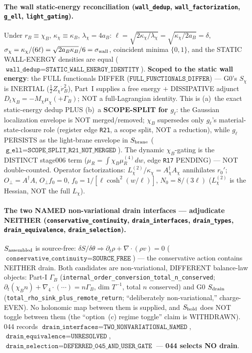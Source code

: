 \paragraph{The wall static-energy reconciliation (\texttt{wall\_dedup}, \texttt{wall\_factorization}, \texttt{g\_ell}, \texttt{light\_gating}).}
Under \(r_B\equiv\chi_B\), \(\kappa_\chi\equiv\kappa_B\), \(\lambda_\chi=4a_B\):
\(\ell=\sqrt{2\kappa_\chi/\lambda_\chi}=\sqrt{\kappa_\chi/2a_B}=\delta\),
\(\sigma_\chi=\kappa_\chi/(6\ell)=\sqrt{2a_B\kappa_B}/6=\sigma_{\rm wall}\), coincident
minima \(\{0,1\}\), and the STATIC WALL-ENERGY densities are equal
(\(\texttt{wall\_dedup}=\texttt{STATIC\_WALL\_ENERGY\_IDENTITY}\)). \textbf{Scoped to
the static wall energy}: the FULL functionals DIFFER
(\(\texttt{FULL\_FUNCTIONALS\_DIFFER}\)) --- G0's \(S_\chi\) is INERTIAL
(\(\tfrac12 Z_\chi\dot r_B^2\)), Part~I supplies a free energy \(+\) DISSIPATIVE
adjunct \(D_t\chi_B=-M_\chi\mu_\chi(+\Gamma_B)\); NOT a full-Lagrangian identity. This
is (a)~the exact static-energy dedup PLUS (b)~a \textbf{SCOPE-SPLIT for \(g_\ell\)}: the
Gaussian localization envelope is NOT merged/removed; \(\chi_B\) supersedes only
\(g_\ell\)'s material-state-closure role (register edge \texttt{R21}, a scope split, NOT
a reduction), while \(g_\ell\) PERSISTS as the light-brane envelope in \(S_{\rm brane}\)
(\(\texttt{g\_ell}=\texttt{SCOPE\_SPLIT\_R21\_NOT\_MERGED}\)). The dynamic
\(\chi_B\)-gating is the DISTINCT stage006 term (\(\mu_R=\int\chi_B\mu_R^{(4)}dw\), edge
\texttt{R17} PENDING) --- NOT double-counted. Operator factorizations:
\(L_\chi^{(2)}/\kappa_\chi=A_\chi^\dagger A_\chi\) annihilates \(r_0'\);
\(O_\perp=A^\dagger A\), \(O_\perp f_0=0\), \(f_0=1/[\ell\cosh^2(w/\ell)]\),
\(N_0=8/(3\ell)\) (\(L_\chi^{(2)}\) is the Hessian, NOT the full \(L_\chi\)).

\paragraph{The two NAMED non-variational drain interfaces --- adjudicate NEITHER (\texttt{conservative\_continuity}, \texttt{drain\_interfaces}, \texttt{drain\_types}, \texttt{drain\_equivalence}, \texttt{drain\_selection}).}
\(S_{\rm assembled}\) is source-free: \(\delta S/\delta\theta\Rightarrow
\partial_t\rho+\nabla\!\cdot\!(\rho v)=0\)
(\(\texttt{conservative\_continuity}=\texttt{SOURCE\_FREE}\)) --- the conservative action
contains NEITHER drain. Both candidates are non-variational, DIFFERENT balance-law
objects: Part-I \(\Gamma_B\) (\texttt{internal\_order\_conversion\_total\_n\_conserved};
\(\partial_t(\chi_B n)+\nabla_4\!\cdot\!(\cdots)=n\Gamma_B\), dim \(T^{-1}\), total \(n\)
conserved) and G0 \(S_{\rm drain}\)
(\texttt{total\_rho\_sink\_plus\_remote\_return}; ``deliberately non-variational,''
charge-EVEN). No holonomic map between them is supplied, and \(S_{\rm hold}\) does NOT
toggle between them (the ``option~(c) regime toggle'' claim is WITHDRAWN). 044 records
\(\texttt{drain\_interfaces}=\texttt{TWO\_NONVARIATIONAL\_NAMED}\),
\(\texttt{drain\_equivalence}=\texttt{UNRESOLVED}\),
\(\texttt{drain\_selection}=\texttt{DEFERRED\_045\_AND\_USER\_GATE}\) --- \textbf{044
selects NO drain}.

